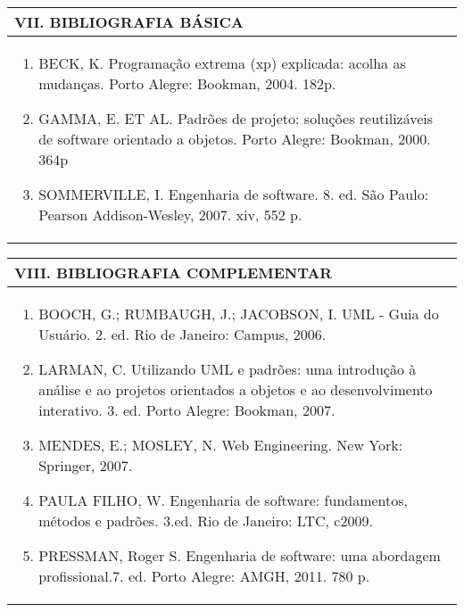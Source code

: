 \documentclass[12pt]{article}
\begin{document}
\begin{longtable}{|L{1.025\textwidth}|} \hline
%
{\bf VII. BIBLIOGRAFIA BÁSICA} \\ \hline
\begin{enumerate}
%
\item BECK, K. Programação extrema (xp) explicada: acolha as mudanças. Porto Alegre: Bookman, 2004. 182p. 
\item GAMMA, E. ET AL. Padrões de projeto: soluções reutilizáveis de software orientado a objetos. Porto Alegre: Bookman, 2000. 364p 
\item SOMMERVILLE, I. Engenharia de software. 8. ed. São Paulo: Pearson Addison-Wesley, 2007. xiv, 552 p.

\end{enumerate}
 \\ \hline
\end{longtable}


\newpage

\begin{longtable}{|L{1.025\textwidth}|} \hline
%
{\bf VIII. BIBLIOGRAFIA COMPLEMENTAR} \\ \hline
\begin{enumerate}
\item BOOCH, G.; RUMBAUGH, J.; JACOBSON, I. UML - Guia do Usuário. 2. ed. Rio de Janeiro: Campus, 2006. 
\item LARMAN, C. Utilizando UML e padrões: uma introdução à análise e ao projetos orientados a objetos e ao desenvolvimento interativo. 3. ed. Porto Alegre: Bookman, 2007. 
\item MENDES, E.; MOSLEY, N. Web Engineering. New York: Springer, 2007. 
\item PAULA FILHO, W. Engenharia de software: fundamentos, métodos e padrões. 3.ed. Rio de Janeiro: LTC, c2009. 
\item PRESSMAN, Roger S. Engenharia de software: uma abordagem profissional.7. ed. Porto Alegre: AMGH, 2011. 780 p.

%
\end{enumerate}
 \\ \hline
\end{longtable}



\end{document}
